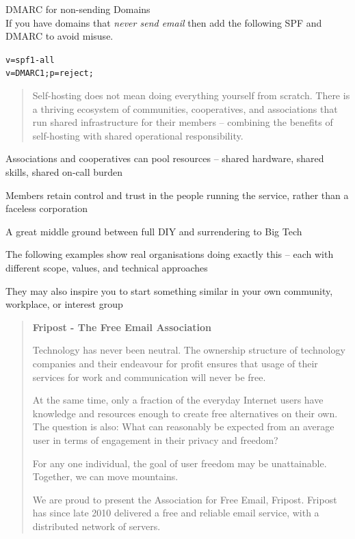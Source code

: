 \documentclass[Screen16to9,17pt]{foils}
\begin{document}
DMARC for non-sending Domains\\
If you have domains that \emph{never send email} then add the following SPF and DMARC to avoid misuse.

\begin{alltt}
v=spf1 -all
v=DMARC1; p=reject;
\end{alltt}




\begin{quote}
Self-hosting does not mean doing everything yourself from scratch.
There is a thriving ecosystem of communities, cooperatives, and associations
that run shared infrastructure for their members -- combining the benefits
of self-hosting with shared operational responsibility.
\end{quote}

\begin{list2}
\item Associations and cooperatives can pool resources -- shared hardware,
shared skills, shared on-call burden
\item Members retain control and trust in the people running the service,
rather than a faceless corporation
\item A great middle ground between full DIY and surrendering to Big Tech
\item The following examples show real organisations doing exactly this --
each with different scope, values, and technical approaches
\item They may also inspire you to start something similar in your own community,
workplace, or interest group
\end{list2}



\begin{quote}{\bf \large
Fripost - The Free Email Association}

Technology has never been neutral. The ownership structure of technology companies and their endeavour for profit ensures that usage of their services for work and communication will never be free.

At the same time, only a fraction of the everyday Internet users have knowledge and resources enough to create free alternatives on their own. The question is also: What can reasonably be expected from an average user in terms of engagement in their privacy and freedom?

For any one individual, the goal of user freedom may be unattainable. Together, we can move mountains.

We are proud to present the Association for Free Email, Fripost. Fripost has since late 2010 delivered a free and reliable email service, with a distributed network of servers.
\end{quote}
\end{document}
